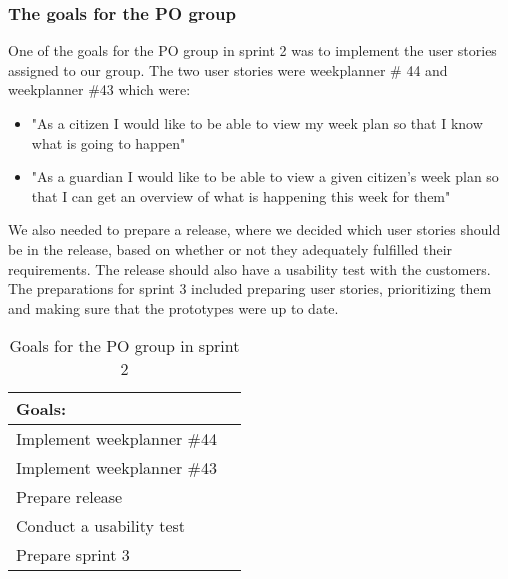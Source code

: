 \subsubsection{The goals for the PO group}
One of the goals for the PO group in sprint 2 was to implement the user stories assigned to our group.
The two user stories were weekplanner \# 44 and weekplanner \#43 which were:
\begin{itemize}
 \item "As a citizen I would like to be able to view my week plan so that I know what is going to happen" 
 \item "As a guardian I would like to be able to view a given citizen's week plan so that I can get an overview of what is happening this week for them"
\end{itemize}
We also needed to prepare a release, where we decided which user stories should be in the release, based on whether or not they adequately fulfilled their requirements.
The release should also have a usability test with the customers.
The preparations for sprint 3 included preparing user stories, prioritizing them and making sure that the prototypes were up to date.
\begin{table}[H]
    \centering
    \begin{tabular}{|l|l|}
    \hline
    Goals:                                   \\ \hline
    Implement weekplanner \#44               \\ \hline
    Implement weekplanner \#43               \\ \hline
    Prepare release                          \\ \hline
    Conduct a usability test                   \\ \hline
    Prepare sprint 3                         \\ \hline
    \end{tabular}
    \caption{Goals for the PO group in sprint 2}
    \label{PO-goal-sprint-2}
\end{table}
